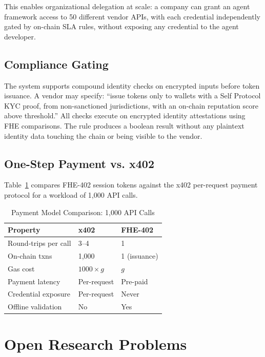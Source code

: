 \documentclass[conference]{IEEEtran}
\begin{document}
This enables organizational delegation at scale: a company can grant an agent framework
access to 50 different vendor APIs, with each credential independently gated by
on-chain SLA rules, without exposing any credential to the agent developer.

\subsection{Compliance Gating}
The system supports compound identity checks on encrypted inputs before token issuance.
A vendor may specify: ``issue tokens only to wallets with a Self Protocol KYC proof,
from non-sanctioned jurisdictions, with an on-chain reputation score above threshold.''
All checks execute on encrypted identity attestations using FHE comparisons. The rule
produces a boolean result without any plaintext identity data touching the chain or
being visible to the vendor.

\subsection{One-Step Payment vs. x402}
Table~\ref{tab:payment} compares FHE-402 session tokens against the x402 per-request
payment protocol for a workload of 1,000 API calls.

\begin{table}[h]
\caption{Payment Model Comparison: 1,000 API Calls}
\label{tab:payment}
\renewcommand{\arraystretch}{1.2}
\begin{tabular}{lll}
\toprule
\textbf{Property} & \textbf{x402} & \textbf{FHE-402} \\
\midrule
Round-trips per call & 3--4 & 1 \\
On-chain txns & 1,000 & 1 (issuance) \\
Gas cost & $1000 \times g$ & $g$ \\
Payment latency & Per-request & Pre-paid \\
Credential exposure & Per-request & Never \\
Offline validation & No & Yes \\
\bottomrule
\end{tabular}
\end{table}

\section{Open Research Problems}
\label{sec:open}
\end{document}
